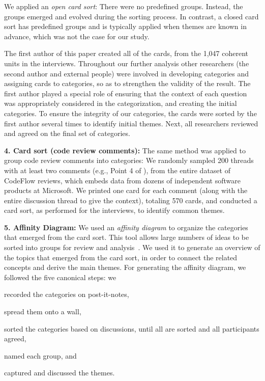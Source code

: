 We applied an \emph{open card sort}: There were no predefined groups. Instead, the
groups emerged and evolved during the sorting process. In contrast, a closed
card sort has predefined groups and is typically applied when themes are known
in advance, which was not the case for our study.

The first author of this paper created all of the cards, from the 1,047
coherent units in the interviews. Throughout our further analysis other
researchers (the second author and external people) were involved in developing
categories and assigning cards to categories, so as to strengthen the validity
of the result. The first author played a special role of ensuring that the
context of each question was appropriately considered in the categorization,
and creating the initial categories. To ensure the integrity of our categories,
the cards were sorted by the first author several times to identify initial
themes. Next, all researchers reviewed and agreed on the final set of
categories.

\textbf{4. Card sort (code review comments):} The same method was applied to group code
review comments into categories: We randomly sampled 200 threads with at least
two comments (e.g., Point 4 of ), from the entire dataset of CodeFlow
reviews, which embeds data from dozens of independent software products at
Microsoft. We printed one card for each comment (along with the entire
discussion thread to give the context), totaling 570 cards, and conducted a
card sort, as performed for the interviews, to identify common themes.

\textbf{5. Affinity Diagram:} We used an \emph{affinity diagram} to organize the categories
that emerged from the card sort. This tool allows large numbers of ideas to be
sorted into groups for review and analysis~\cite{shade2000improving}. We used it
to generate an overview of the topics that emerged from the card sort, in order
to connect the related concepts and derive the main themes. For generating the
affinity diagram, we followed the five canonical steps: we \begin{inparaenum}[(1)] 
\item recorded the categories on post-it-notes, 
\item spread them onto a wall, 
\item sorted the categories based on discussions, until all are sorted and all participants agreed, 
\item named each group, and 
\item captured and discussed the themes.
\end{inparaenum}


